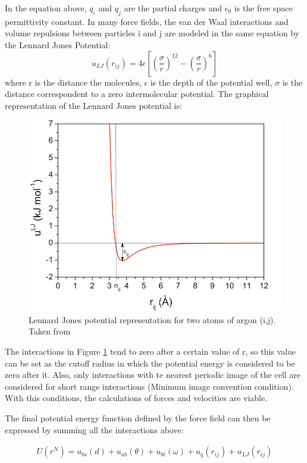 In the equation above, $q_{i}$ and $q_{j}$ are the partial charges and  $\epsilon _{0}$ is the free space permittivity constant. In many force fields, the van der Waal interactions and volume repulsions between particles i and j are modeled in the same equation by the Lennard Jones Potential:
\begin{equation}
u_{LJ}(r_{ij}) = 4 \epsilon
\left[ \left(\frac{\sigma}{r} \right)^{12} - \left(\frac{\sigma}{r} \right)^{6} \right]
\end{equation}
where r is the distance the molecules, $\epsilon$ is the depth of the potential well, $\sigma$ is the distance correspondent to a zero intermolecular potential. The graphical representation of the Lennard Jones potential is:
\begin{figure}[H]
	\centering
	\includegraphics[width=0.8\linewidth]{Figures/lj2}
	\caption{Lennard Jones potential representation for two atoms of argon (i,j). Taken from  }
	\label{fig:lj}
\end{figure}

The interactions in Figure \ref{fig:lj} tend to zero after a certain value of r, so this value can be set as the cutoff radius in which the potential energy is considered to be zero after it. Also, only interactions with te nearest periodic image of the cell are considered for short range interactions (Minimum image convention condition). With this conditions, the calculations of forces and velocities are viable.

The final potential energy function defined by the force field can then be expressed by summing all the interactions above:

\begin{equation}
\begin{aligned}
U(r^N) = u_{bs}(d) + u_{ab}(\theta) + u_{bt}(\omega) + u_{q}(r_{ij}) + u_{LJ}(r_{ij})
\end{aligned}
\end{equation}

